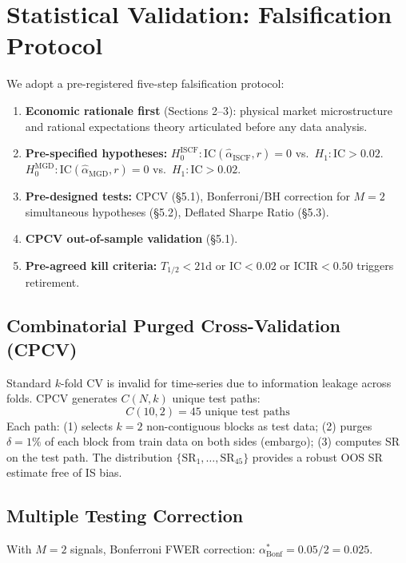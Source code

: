 \documentclass[11pt]{article}
\begin{document}
\section{Statistical Validation: Falsification Protocol}

We adopt a pre-registered five-step falsification protocol:
\begin{enumerate}
\item \textbf{Economic rationale first} (Sections 2--3): physical market microstructure and rational expectations theory articulated before any data analysis.
\item \textbf{Pre-specified hypotheses:} $H_0^{\text{ISCF}}: \text{IC}(\hat{\alpha}_{\text{ISCF}}, r) = 0$ vs.\ $H_1: \text{IC} > 0.02$. $H_0^{\text{MGD}}: \text{IC}(\hat{\alpha}_{\text{MGD}}, r) = 0$ vs.\ $H_1: \text{IC} > 0.02$.
\item \textbf{Pre-designed tests:} CPCV (\S5.1), Bonferroni/BH correction for $M=2$ simultaneous hypotheses (\S5.2), Deflated Sharpe Ratio (\S5.3).
\item \textbf{CPCV out-of-sample validation} (\S5.1).
\item \textbf{Pre-agreed kill criteria:} $T_{1/2} < 21$d or $\text{IC} < 0.02$ or $\text{ICIR} < 0.50$ triggers retirement.
\end{enumerate}

\subsection{Combinatorial Purged Cross-Validation (CPCV)}

Standard $k$-fold CV is invalid for time-series due to information leakage across folds. CPCV generates $C(N,k)$ unique test paths:
\begin{equation}
C(10,2) = 45 \text{ unique test paths}
\label{eq:cpcv-paths}
\end{equation}
Each path: (1) selects $k=2$ non-contiguous blocks as test data; (2) purges $\delta = 1\%$ of each block from train data on both sides (embargo); (3) computes SR on the test path. The distribution $\{\text{SR}_1, \ldots, \text{SR}_{45}\}$ provides a robust OOS SR estimate free of IS bias.

\subsection{Multiple Testing Correction}

With $M=2$ signals, Bonferroni FWER correction: $\alpha^*_{\text{Bonf}} = 0.05/2 = 0.025$.
\end{document}
